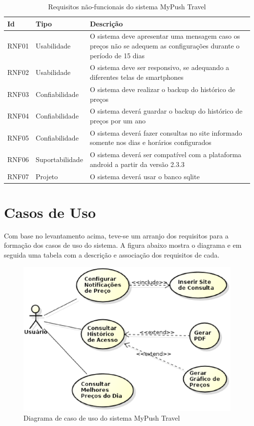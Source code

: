 \begin{table}[H]
	\centering
	\begin{tabular}{p{3cm}|p{5cm}|p{6cm}}
		\toprule
			\textbf{Id} & \textbf{Tipo} & \textbf{Descrição} \\ \hline
		\midrule
			RNF01 & Usabilidade & O sistema deve apresentar uma mensagem caso os preços não se adequem as configurações durante o período de 15 dias \\ \hline
			RNF02 & Usabilidade & O sistema deve ser responsivo, se adequando a diferentes telas de smartphones \\ \hline
			RNF03 & Confiabilidade & O sistema deve realizar o backup do histórico de preços \\ \hline
			RNF04 & Confiabilidade & O sistema deverá guardar o backup do histórico de preços por um ano \\ \hline
			RNF05 & Confiabilidade & O sistema deverá fazer consultas no site informado somente nos dias e horários configurados \\ \hline
			RNF06 & Suportabilidade & O sistema deverá ser compatível com a plataforma android a partir da versão 2.3.3 \\ \hline
			RNF07 & Projeto & O sistema deverá usar o banco sqlite \\ \hline
		\bottomrule
	\end{tabular}
	\caption{Requisitos não-funcionais do sistema MyPush Travel}
	\label{tab02}
\end{table}

\section{Casos de Uso}

Com base no levantamento acima, teve-se um arranjo dos requisitos para a formação dos casos de uso do sistema. A figura abaixo mostra o diagrama e em seguida uma tabela com a descrição e associação dos requisitos de cada.

\begin{figure}[H]
	\centering
	\includegraphics[scale=0.5]{figuras/caso_de_uso_mypush.eps}
	\caption{Diagrama de caso de uso do sistema MyPush Travel}
\end{figure}


